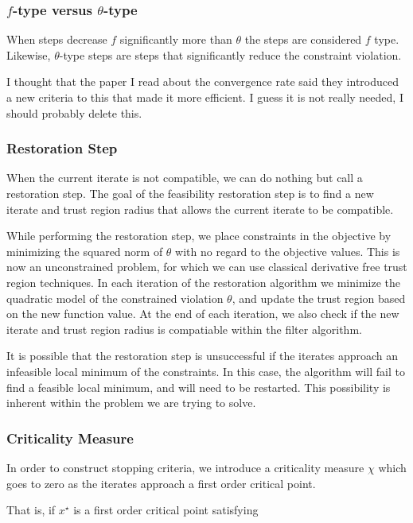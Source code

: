 \documentclass{article}
\begin{document}
\subsubsection{$f$-type versus $\theta$-type}

When steps decrease $f$ significantly more than $\theta$ the steps are considered $f$ type.
Likewise, $\theta$-type steps are steps that significantly reduce the constraint violation.

I thought that the paper I read about the convergence rate said they introduced a new criteria to this that made it more efficient.
I guess it is not really needed, I should probably delete this.

\subsubsection{Restoration Step}

When the current iterate is not compatible, we can do nothing but call a restoration step.
The goal of the feasibility restoration step is to find a new iterate and trust region radius that allows the current iterate to be compatible.

While performing the restoration step, we place constraints in the objective by minimizing the squared norm of $\theta$ with no regard to the objective values.
This is now an unconstrained problem, for which we can use classical derivative free trust region techniques.
In each iteration of the restoration algorithm we minimize the quadratic model of the constrained violation $\theta$, and update the trust region based on the new function value.
At the end of each iteration, we also check if the new iterate and trust region radius is compatiable within the filter algorithm.

It is possible that the restoration step is unsuccessful if the iterates approach an infeasible local minimum of the constraints.
In this case, the algorithm will fail to find a feasible local minimum, and will need to be restarted.
This possibility is inherent within the problem we are trying to solve.

\subsubsection{Criticality Measure}
In order to construct stopping criteria, we introduce a criticality measure $\chi$ which goes to zero as the iterates approach a first order critical point.

That is, if $x^{\star}$ is a first order critical point satisfying
\end{document}
